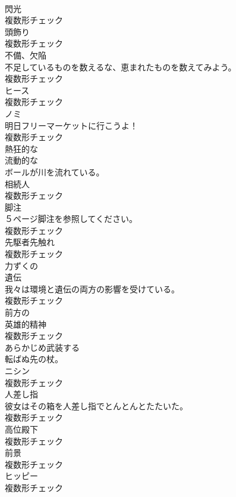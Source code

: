 \documentclass[8pt]{extreport}
\begin{document}
\begin{CJK}{UTF8}{min}
\\	[名詞]	閃光	
\\	複数形チェック
\\	[名詞]	頭飾り	
\\	複数形チェック
\\	[名詞]	不備、欠陥	
\\	不足しているものを数えるな、恵まれたものを数えてみよう。	
\\	複数形チェック
\\	[名詞]	ヒース	
\\	複数形チェック
\\	[名詞]	ノミ	
\\	明日フリーマーケットに行こうよ！	
\\	複数形チェック
\\	[形容詞]	熱狂的な	
\\	[形容詞]	流動的な	
\\	ボールが川を流れている。	
\\	[名詞]	相続人	
\\	複数形チェック
\\	[名詞]	脚注	
\\	５ページ脚注を参照してください。	
\\	複数形チェック
\\	[名詞]	先駆者先触れ	
\\	複数形チェック
\\	[形容詞]	力ずくの	
\\	[名詞]	遺伝	
\\	我々は環境と遺伝の両方の影響を受けている。	
\\	複数形チェック
\\	[形容詞]	前方の	
\\	[名詞]	英雄的精神	
\\	複数形チェック
\\	[動詞]	あらかじめ武装する	
\\	転ばぬ先の杖。	
\\	[名詞]	ニシン	
\\	複数形チェック
\\	[名詞]	人差し指	
\\	彼女はその箱を人差し指でとんとんとたたいた。	
\\	複数形チェック
\\	[名詞]	高位殿下	
\\	複数形チェック
\\	[名詞]	前景	
\\	複数形チェック
\\	[名詞]	ヒッピー	
\\	複数形チェック

\end{CJK}
\end{document}
